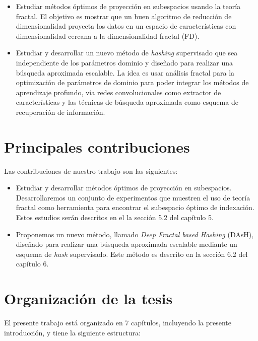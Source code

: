 \begin{itemize}
  \item  Estudiar  m\'etodos óptimos de proyección  en subespacios usando la teoría fractal.  El objetivo es   mostrar que un buen algoritmo de reducción de dimensionalidad  proyecta los datos en un espacio de características con dimensionalidad cercana a la dimensionalidad fractal (FD).

  \item  Estudiar y desarrollar un nuevo m\'etodo de \textit{hashing} supervisado que sea independiente de los parámetros dominio y  diseñado para realizar una búsqueda  aproximada escalable.    La idea es usar análisis fractal para la optimización de parámetros de dominio para poder integrar los métodos de aprendizaje profundo, vía redes convolucionales como extractor de características y las técnicas de búsqueda aproximada como esquema de recuperación de información.
\end{itemize}
 

\section{Principales contribuciones}

 

Las contribuciones de nuestro trabajo son las siguientes:
\begin{itemize}

    \item  Estudiar y desarrollar  métodos óptimos de proyección en subespacios. Desarrollaremos un conjunto de experimentos que muestren el uso de teoría fractal como herramienta para encontrar  el subespacio óptimo  de indexación.    Estos estudios serán   descritos en el la sección 5.2 del capítulo 5.

  \item Proponemos un nuevo método, llamado \textit{Deep Fractal based  Hashing} (DAsH), diseñado para realizar una búsqueda aproximada escalable mediante un esquema de \textit{hash} supervisado. Este m\'etodo es descrito en la sección 6.2 del capítulo 6.
\end{itemize}

\section{Organización de la tesis}

El presente trabajo está organizado en 7 capítulos, incluyendo la presente introducción, y tiene la  siguiente estructura:

